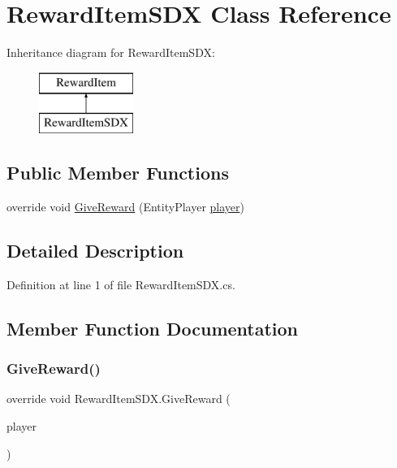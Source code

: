 \hypertarget{class_reward_item_s_d_x}{}\section{Reward\+Item\+S\+DX Class Reference}
\label{class_reward_item_s_d_x}
Inheritance diagram for Reward\+Item\+S\+DX\+:\begin{figure}[H]
\begin{center}
\leavevmode
\includegraphics[height=2.000000cm]{class_reward_item_s_d_x}
\end{center}
\end{figure}
\subsection*{Public Member Functions}
\begin{DoxyCompactItemize}
\item 
override void \mbox{\hyperlink{class_reward_item_s_d_x_a60551dd7a63cc203433ae127aa5d3b36}{Give\+Reward}} (Entity\+Player \mbox{\hyperlink{_sphere_i_i_01_music_01_boxes_2_config_2_localization_8txt_a4e2cb8aeff651600ea1cc57fe5a929a4}{player}})
\end{DoxyCompactItemize}


\subsection{Detailed Description}


Definition at line 1 of file Reward\+Item\+S\+D\+X.\+cs.



\subsection{Member Function Documentation}
\mbox{\label{class_reward_item_s_d_x_a60551dd7a63cc203433ae127aa5d3b36}} 
\subsubsection{\texorpdfstring{GiveReward()}{GiveReward()}}
{\footnotesize\ttfamily override void Reward\+Item\+S\+D\+X.\+Give\+Reward (\begin{DoxyParamCaption}\item[{Entity\+Player}]{player }\end{DoxyParamCaption})}



